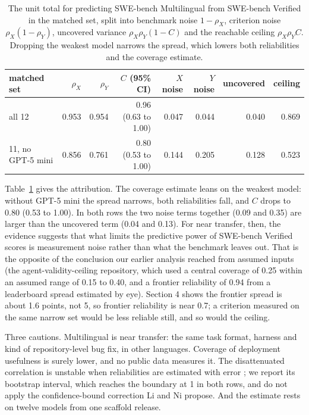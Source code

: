 \documentclass[11pt]{article}
\begin{document}
\begin{table}[t]
\centering
\small
\begin{tabular}{lrrrrrrr}
\toprule
matched set & $\rho_X$ & $\rho_Y$ & $C$ (95\% CI) & $X$ noise & $Y$ noise & uncovered & ceiling \\
\midrule
all 12 & 0.953 & 0.954 & 0.96 (0.63 to 1.00) & 0.047 & 0.044 & 0.040 & 0.869 \\
11, no GPT-5 mini & 0.856 & 0.761 & 0.80 (0.53 to 1.00) & 0.144 & 0.205 & 0.128 & 0.523 \\
\bottomrule
\end{tabular}
\caption{The unit total for predicting SWE-bench Multilingual from SWE-bench Verified in the matched set, split into benchmark noise $1-\rho_X$, criterion noise $\rho_X(1-\rho_Y)$, uncovered variance $\rho_X\rho_Y(1-C)$ and the reachable ceiling $\rho_X\rho_Y C$. Dropping the weakest model narrows the spread, which lowers both reliabilities and the coverage estimate.}
\label{tab:ceiling}
\end{table}

Table~\ref{tab:ceiling} gives the attribution. The coverage estimate leans on the weakest model: without GPT-5 mini the spread narrows, both reliabilities fall, and $C$ drops to 0.80 (0.53 to 1.00). In both rows the two noise terms together (0.09 and 0.35) are larger than the uncovered term (0.04 and 0.13). For near transfer, then, the evidence suggests that what limits the predictive power of SWE-bench Verified scores is measurement noise rather than what the benchmark leaves out. That is the opposite of the conclusion our earlier analysis reached from assumed inputs (the agent-validity-ceiling repository, which used a central coverage of 0.25 within an assumed range of 0.15 to 0.40, and a frontier reliability of 0.94 from a leaderboard spread estimated by eye). Section 4 shows the frontier spread is about 1.6 points, not 5, so frontier reliability is near 0.7; a criterion measured on the same narrow set would be less reliable still, and so would the ceiling.

Three cautions. Multilingual is near transfer: the same task format, harness and kind of repository-level bug fix, in other languages. Coverage of deployment usefulness is surely lower, and no public data measures it. The disattenuated correlation is unstable when reliabilities are estimated with error \citep{li2026measuredorreal}; we report its bootstrap interval, which reaches the boundary at 1 in both rows, and do not apply the confidence-bound correction Li and Ni propose. And the estimate rests on twelve models from one scaffold release.
\end{document}

